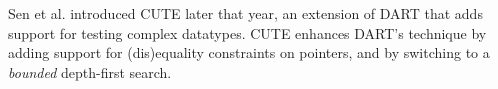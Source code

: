 Sen et al. introduced CUTE \cite{Sen2005-ju} later that year, an
extension of DART that adds support for testing complex datatypes.
%
CUTE enhances DART's technique by adding support for (dis)equality
constraints on pointers, and by switching to a \emph{bounded}
depth-first search.
%
%
%
%
%
%
